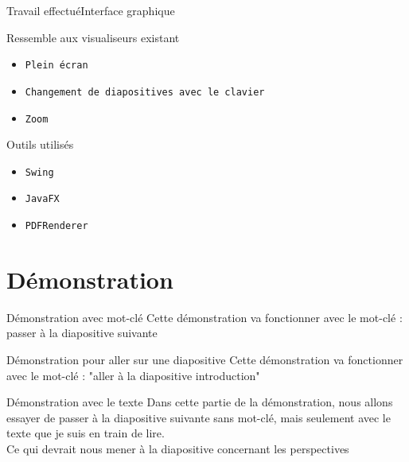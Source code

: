 \documentclass[10pt]{beamer}
\begin{document}
\begin{frame}{Travail effectué}{Interface graphique}
	\begin{block}{Ressemble aux visualiseurs existant}
	  	\begin{itemize}
	    		\item {\tt Plein écran}
	    		\item {\tt Changement de diapositives avec le clavier}
	    		\item {\tt Zoom}
		\end{itemize}
	\end{block}

	\begin{block}{Outils utilisés}
	  	\begin{itemize}
	    			\item {\tt Swing}
	    			\item {\tt JavaFX}	    		
			    \item {\tt PDFRenderer}		
		\end{itemize}
	\end{block}		  			
\end{frame}

\section{Démonstration}
\begin{frame}{Démonstration avec mot-clé}
	Cette démonstration va fonctionner avec le mot-clé : passer à la diapositive suivante	
\end{frame}

\begin{frame}{Démonstration pour aller sur une diapositive}
	Cette démonstration va fonctionner avec le mot-clé : "aller à la diapositive introduction"		
\end{frame}

\begin{frame}{Démonstration avec le texte}
	Dans cette partie de la démonstration, nous allons essayer de passer à la diapositive suivante sans mot-clé, mais seulement avec le texte que je suis en train de lire. \\	
	
	Ce qui devrait nous mener à la diapositive concernant les perspectives
\end{frame}
\end{document}
